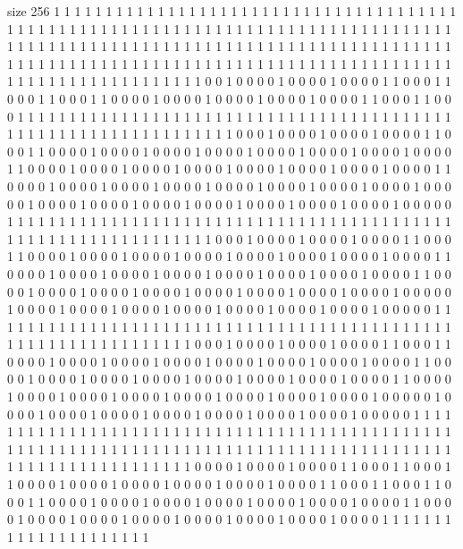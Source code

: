 size 256
1 1 1 1 1 1 1 1 1 1 1 1 1 1 1 1 1 1 1 1
1 1 1 1 1 1 1 1 1 1 1 1 1 1 1 1 1 1 1 1
1 1 1 1 1 1 1 1 1 1 1 1 1 1 1 1 1 1 1 1
1 1 1 1 1 1 1 1 1 1 1 1 1 1 1 1 1 1 1 1
1 1 1 1 1 1 1 1 1 1 1 1 1 1 1 1 1 1 1 1
1 1 1 1 1 1 1 1 1 1 1 1 1 1 1 1 1 1 1 1
1 1 1 1 1 1 1 1 1 1 1 1 1 1 1 1 1 1 1 1
1 1 1 1 1 1 1 1 1 1 1 1 1 1 1 1 1 1 1 1
1 1 1 1 1 1 1 1 1 1 1 1 1 1 1 1 1 1 1 1
1 1 1 1 1 1 1 0 0 1 0 0 0 0 1 0 0 0 0 1
0 0 0 0 1 1 0 0 0 1 1 0 0 0 1 1 0 0 0 1
1 0 0 0 0 1 0 0 0 0 1 0 0 0 0 1 0 0 0 0
1 0 0 0 0 1 1 0 0 0 1 1 0 0 0 1 1 1 1 1
1 1 1 1 1 1 1 1 1 1 1 1 1 1 1 1 1 1 1 1
1 1 1 1 1 1 1 1 1 1 1 1 1 1 1 1 1 1 1 1
1 1 1 1 1 1 1 1 1 1 1 1 1 1 1 1 1 1 1 0
0 0 1 0 0 0 0 1 0 0 0 0 1 0 0 0 0 1 1 0
0 0 1 1 0 0 0 0 1 0 0 0 0 1 0 0 0 0 1 0
0 0 0 1 0 0 0 0 1 0 0 0 0 1 0 0 0 0 1 0
0 0 0 1 1 0 0 0 0 1 0 0 0 0 1 0 0 0 0 1
0 0 0 0 1 0 0 0 0 1 0 0 0 0 1 0 0 0 0 1
0 0 0 0 1 1 0 0 0 0 1 0 0 0 0 1 0 0 0 0
1 0 0 0 0 1 0 0 0 0 1 0 0 0 0 1 0 0 0 0
1 0 0 0 0 1 0 0 0 0 0 1 0 0 0 0 1 0 0 0
0 1 0 0 0 0 1 0 0 0 0 1 0 0 0 0 1 0 0 0
0 1 0 0 0 0 1 0 0 0 0 0 1 1 1 1 1 1 1 1
1 1 1 1 1 1 1 1 1 1 1 1 1 1 1 1 1 1 1 1
1 1 1 1 1 1 1 1 1 1 1 1 1 1 1 1 1 1 1 1
1 1 1 1 1 1 1 1 1 1 1 1 1 1 1 0 0 0 1 0
0 0 0 1 0 0 0 0 1 0 0 0 0 1 1 0 0 0 1 1
0 0 0 0 1 0 0 0 0 1 0 0 0 0 1 0 0 0 0 1
0 0 0 0 1 0 0 0 0 1 0 0 0 0 1 0 0 0 0 1
1 0 0 0 0 1 0 0 0 0 1 0 0 0 0 1 0 0 0 0
1 0 0 0 0 1 0 0 0 0 1 0 0 0 0 1 0 0 0 0
1 1 0 0 0 0 1 0 0 0 0 1 0 0 0 0 1 0 0 0
0 1 0 0 0 0 1 0 0 0 0 1 0 0 0 0 1 0 0 0
0 1 0 0 0 0 0 1 0 0 0 0 1 0 0 0 0 1 0 0
0 0 1 0 0 0 0 1 0 0 0 0 1 0 0 0 0 1 0 0
0 0 1 0 0 0 0 0 1 1 1 1 1 1 1 1 1 1 1 1
1 1 1 1 1 1 1 1 1 1 1 1 1 1 1 1 1 1 1 1
1 1 1 1 1 1 1 1 1 1 1 1 1 1 1 1 1 1 1 1
1 1 1 1 1 1 1 1 1 1 1 0 0 0 1 0 0 0 0 1
0 0 0 0 1 0 0 0 0 1 1 0 0 0 1 1 0 0 0 0
1 0 0 0 0 1 0 0 0 0 1 0 0 0 0 1 0 0 0 0
1 0 0 0 0 1 0 0 0 0 1 0 0 0 0 1 1 0 0 0
0 1 0 0 0 0 1 0 0 0 0 1 0 0 0 0 1 0 0 0
0 1 0 0 0 0 1 0 0 0 0 1 0 0 0 0 1 1 0 0
0 0 1 0 0 0 0 1 0 0 0 0 1 0 0 0 0 1 0 0
0 0 1 0 0 0 0 1 0 0 0 0 1 0 0 0 0 1 0 0
0 0 0 1 0 0 0 0 1 0 0 0 0 1 0 0 0 0 1 0
0 0 0 1 0 0 0 0 1 0 0 0 0 1 0 0 0 0 1 0
0 0 0 0 1 1 1 1 1 1 1 1 1 1 1 1 1 1 1 1
1 1 1 1 1 1 1 1 1 1 1 1 1 1 1 1 1 1 1 1
1 1 1 1 1 1 1 1 1 1 1 1 1 1 1 1 1 1 1 1
1 1 1 1 1 1 1 1 1 1 1 1 1 1 1 1 1 1 1 1
1 1 1 1 1 1 1 1 1 1 1 1 1 1 1 1 1 1 1 1
1 1 1 1 1 1 1 1 1 1 1 1 0 0 0 0 1 0 0 0
0 1 0 0 0 0 1 1 0 0 0 1 1 0 0 0 1 1 0 0
0 0 1 0 0 0 0 1 0 0 0 0 1 0 0 0 0 1 0 0
0 0 1 0 0 0 0 1 1 0 0 0 1 1 0 0 0 1 1 0
0 0 1 1 0 0 0 0 1 0 0 0 0 1 0 0 0 0 1 0
0 0 0 1 0 0 0 0 1 0 0 0 0 1 0 0 0 0 1 1
0 0 0 0 1 0 0 0 0 1 0 0 0 0 1 0 0 0 0 1
0 0 0 0 1 0 0 0 0 1 0 0 0 0 1 0 0 0 0 1
1 1 1 1 1 1 1 1 1 1 1 1 1 1 1 1 1 1 1 1
